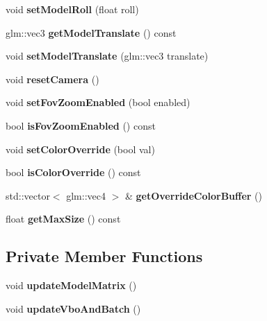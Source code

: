 \begin{DoxyCompactItemize}
void {\bfseries set\+Model\+Roll} (float roll)
\item 
\mbox{\label{classpepr3d_1_1_model_view_aa02348736ac32b98423eb091c74ee0a2}} 
glm\+::vec3 {\bfseries get\+Model\+Translate} () const
\item 
\mbox{\label{classpepr3d_1_1_model_view_a746d83e4e97ca487e3c78c4576b808d9}} 
void {\bfseries set\+Model\+Translate} (glm\+::vec3 translate)
\item 
\mbox{\label{classpepr3d_1_1_model_view_a2fc846e84bbc088d430d65d29dabb663}} 
void {\bfseries reset\+Camera} ()
\item 
\mbox{\label{classpepr3d_1_1_model_view_afc02d10fd1a5a0607a6a494475139993}} 
void {\bfseries set\+Fov\+Zoom\+Enabled} (bool enabled)
\item 
\mbox{\label{classpepr3d_1_1_model_view_a9d6337d9cc434235ed959b6efb22ca83}} 
bool {\bfseries is\+Fov\+Zoom\+Enabled} () const
\item 
\mbox{\label{classpepr3d_1_1_model_view_aa55de542cc8588d1fca8398f588602db}} 
void {\bfseries set\+Color\+Override} (bool val)
\item 
\mbox{\label{classpepr3d_1_1_model_view_a55cf0ef14fc43eda6567ac6b33b786f4}} 
bool {\bfseries is\+Color\+Override} () const
\item 
\mbox{\label{classpepr3d_1_1_model_view_a27cbaf51762a74685b86a58103b5a1e8}} 
std\+::vector$<$ glm\+::vec4 $>$ \& {\bfseries get\+Override\+Color\+Buffer} ()
\item 
\mbox{\label{classpepr3d_1_1_model_view_af9f8bb7d19cca89bc4cdfc8f958c0eaa}} 
float {\bfseries get\+Max\+Size} () const
\end{DoxyCompactItemize}
\subsection*{Private Member Functions}
\begin{DoxyCompactItemize}
\item 
\mbox{\label{classpepr3d_1_1_model_view_a13a0075d890659252e739cb212f5ce1a}} 
void {\bfseries update\+Model\+Matrix} ()
\item 
\mbox{\label{classpepr3d_1_1_model_view_acd9a0fe559b6443aa3baeae23fd21809}} 
void {\bfseries update\+Vbo\+And\+Batch} ()
\end{DoxyCompactItemize}

